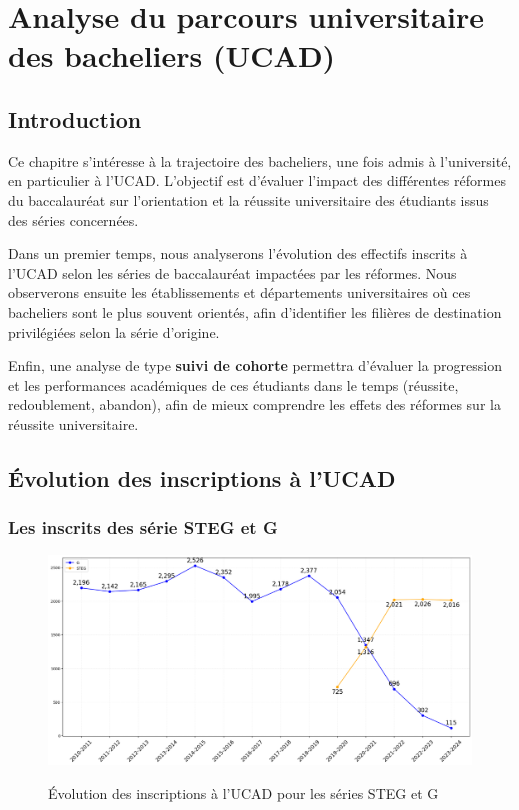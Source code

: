 \chapter{Analyse du parcours universitaire des bacheliers (UCAD)}

\section{Introduction}

Ce chapitre s'intéresse à la trajectoire des bacheliers, une fois admis à l'université, en particulier à l'UCAD. 
L’objectif est d’évaluer l’impact des différentes réformes du baccalauréat sur l’orientation et la réussite universitaire des étudiants issus des séries concernées.

Dans un premier temps, nous analyserons l’évolution des effectifs inscrits à l’UCAD selon les séries de baccalauréat impactées par les réformes.
Nous observerons ensuite les établissements et départements universitaires où ces bacheliers sont le plus souvent orientés, afin d’identifier les filières de destination privilégiées selon la série d’origine.

Enfin, une analyse de type \textbf{suivi de cohorte} permettra d’évaluer la progression et les performances académiques de ces étudiants dans le temps (réussite, redoublement, abandon), afin de mieux comprendre les effets des réformes sur la réussite universitaire.

\newpage
\section{Évolution des inscriptions à l'UCAD}

\subsection{Les inscrits des série STEG et G}

\begin{figure}[ht]
\centering
\caption{Évolution des inscriptions à l'UCAD pour les séries STEG et G}
\includegraphics[width=1\textwidth]{figure/Inscrits_ucad_STEG.png}
\label{fig:inscrits_ucad_steg}
\end{figure}

